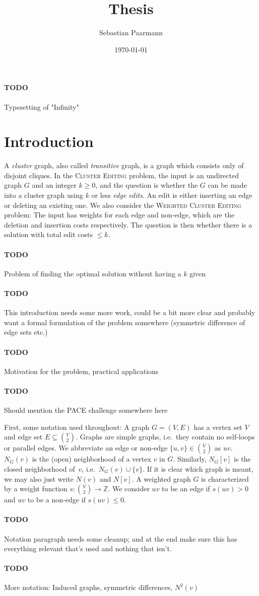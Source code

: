 \documentclass{article}
\title{Thesis}
\author{Sebastian Paarmann}
\date\today
\newcommand{\todo}[1]{\paragraph{TODO} #1}
\theoremstyle{definition}
\begin{document}
\maketitle

\tableofcontents

\todo Typesetting of "Infinity"

\section{Introduction}

A \emph{cluster} graph, also called \emph{transitive} graph, is a graph which consists only of
disjoint cliques.  In the \textsc{Cluster Editing} problem, the input is an undirected graph $G$ and
an integer $k \geq 0$, and the question is whether the $G$ can be made into a cluster graph using
$k$ or less \emph{edge edits}. An edit is either inserting an edge or deleting an existing one. We
also consider the \textsc{Weighted Cluster Editing} problem: The input has weights for each edge and
non-edge, which are the deletion and insertion costs respectively. The question is then whether
there is a solution with total edit costs $\leq k$.

\todo Problem of finding the optimal solution without having a $k$ given

\todo This introduction needs some more work, could be a bit more clear and probably want a
formal formulation of the problem somewhere (symmetric difference of edge sets etc.)

\todo Motivation for the problem, practical applications

\todo Should mention the PACE challenge somewhere here

First, some notation used throughout: A graph $G = (V, E)$ has a vertex set $V$ and edge set $E
\subseteq \binom{V}{2}$. Graphs are simple graphs, i.e.\ they contain no self-loops or parallel edges.
We abbreviate an edge or non-edge $\{u, v\} \in \binom{V}{2}$ as $uv$.  $N_G(v)$ is the (open)
neighborhood of a vertex $v$ in $G$. Similarly, $N_G[v]$ is the closed neighborhood of~$v$, i.e.\
$N_G(v) \cup \{v\}$. If it is clear which graph is meant, we may also just write $N(v)$ and $N[v]$.
A weighted graph $G$ is characterized by a weight function $s\colon \binom{V}{2} \to \mathbb{Z}$. We
consider $uv$ to be an edge if $s(uv) > 0$ and $uv$ to be a non-edge if $s(uv) \leq 0$.

\todo Notation paragraph needs some cleanup; and at the end make sure this has everything relevant
that's used and nothing that isn't.
\todo More notation: Induced graphs, symmetric differences, $N^2(v)$
\end{document}
